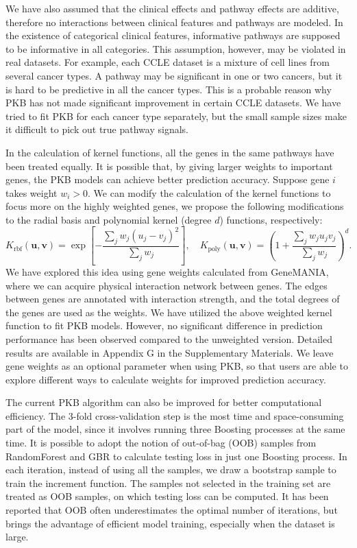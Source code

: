 \documentclass[a4paper,12pt]{article}
\newcommand{\bd}[1]{\mathbf{#1}}
\begin{document}
We have also assumed that the clinical effects and pathway effects are additive, therefore no interactions between clinical features and pathways are modeled. In the existence of categorical clinical features, informative pathways are supposed to be informative in all categories. This assumption, however, may be violated in real datasets. For example, each CCLE dataset is a mixture of cell lines from several cancer types. A pathway may be significant in one or two cancers, but it is hard to be predictive in all the cancer types. This is a probable reason why PKB has not made significant improvement in certain CCLE datasets. We have tried to fit PKB for each cancer type separately, but the small sample sizes make it difficult to pick out true pathway signals. 

In the calculation of kernel functions, all the genes in the same pathways have been treated equally. It is possible that, by giving larger weights to important genes, the PKB models can achieve better prediction accuracy. Suppose gene $i$ takes weight $w_i > 0$. We can modify the calculation of the kernel functions to focus more on the highly weighted genes, we propose the following modifications to the radial basis and polynomial kernel (degree $d$) functions, respectively:
$$ K_{\text{rbf}}(\bd{u}, \bd{v})  =  \exp \left[ - \frac{\sum_j w_j (u_j - v_j)^2}{\sum_j w_j}  \right], \quad
K_{\text{poly}}(\bd{u}, \bd{v})  =  \left( 1 + \frac{ \sum_j w_j u_j v_j }{ \sum_j w_j } \right)^d.$$
We have explored this idea using gene weights calculated from GeneMANIA, \citep{warde2010genemania} where we can acquire physical interaction network between genes. The edges between genes are annotated with interaction strength, and the total degrees of the genes are used as the weights. We have utilized the above weighted kernel function to fit PKB models. However, no significant difference in prediction performance has been observed compared to the unweighted version. Detailed results are available in Appendix G in the Supplementary Materials. We leave gene weights as an optional parameter when using PKB, so that users are able to explore different ways to calculate weights for improved prediction accuracy.

The current PKB algorithm can also be improved for better computational efficiency. The 3-fold cross-validation step is the most time and space-consuming part of the model, since it involves running three Boosting processes at the same time. It is possible to adopt the notion of out-of-bag (OOB) samples from RandomForest and GBR to calculate testing loss in just one Boosting process. In each iteration, instead of using all the samples, we draw a bootstrap sample to train the increment function. The samples not selected in the training set are treated as OOB samples, on which testing loss can be computed. It has been reported that OOB often underestimates the optimal number of iterations, \citep{ridgeway2006gbm} but brings the advantage of efficient model training, especially when the dataset is large.
\end{document}
